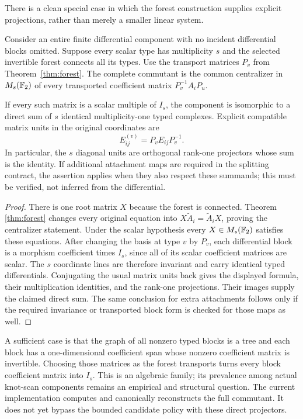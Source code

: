 There is a clean special case in which the forest construction supplies
explicit projections, rather than merely a smaller linear system.

\begin{proposition}
\label{prop:scalar-transport-splitting}
Consider an entire finite differential component with no incident
differential blocks omitted. Suppose every scalar type has multiplicity
$s$ and the selected invertible forest connects all its types. Use the
transport matrices $P_v$ from Theorem~\ref{thm:forest}. The complete
commutant is the common centralizer in $M_s(\mathbb F_2)$ of every transported
coefficient matrix $P_v^{-1}A_iP_u$.

If every such matrix is a scalar multiple of $I_s$, the component is
isomorphic to a direct sum of $s$ identical multiplicity-one typed
complexes. Explicit compatible matrix units in the original coordinates
are
\[
                   E^{(v)}_{ij}=P_v E_{ij}P_v^{-1}.
\]
In particular, the $s$ diagonal units are orthogonal rank-one projectors
whose sum is the identity. If additional attachment maps are required in
the splitting contract, the assertion applies when they also respect
these summands; this must be verified, not inferred from the differential.
\end{proposition}

\begin{proof}
There is one root matrix $X$ because the forest is connected. Theorem
\ref{thm:forest} changes every original equation into $X\widetilde A_i
=\widetilde A_iX$, proving the centralizer statement. Under the scalar
hypothesis every $X\in M_s(\mathbb F_2)$ satisfies these equations. After changing
the basis at type $v$ by $P_v$, each differential block is a morphism
coefficient times $I_s$, since all of its scalar coefficient matrices
are scalar. The $s$ coordinate lines are therefore invariant and carry
identical typed differentials. Conjugating the usual matrix units back
gives the displayed formula, their multiplication identities, and the
rank-one projections. Their images supply the claimed direct sum. The
same conclusion for extra attachments follows only if the required
invariance or transported block form is checked for those maps as well.
\end{proof}

A sufficient case is that the graph of all nonzero typed blocks is a
tree and each block has a one-dimensional coefficient span whose nonzero
coefficient matrix is invertible. Choosing those matrices as the forest
transports turns every block coefficient matrix into $I_s$. This is an
algebraic family; its prevalence among actual knot-scan components remains
an empirical and structural question. The current implementation computes
and canonically reconstructs the full commutant. It does not yet bypass
the bounded candidate policy with these direct projectors.

